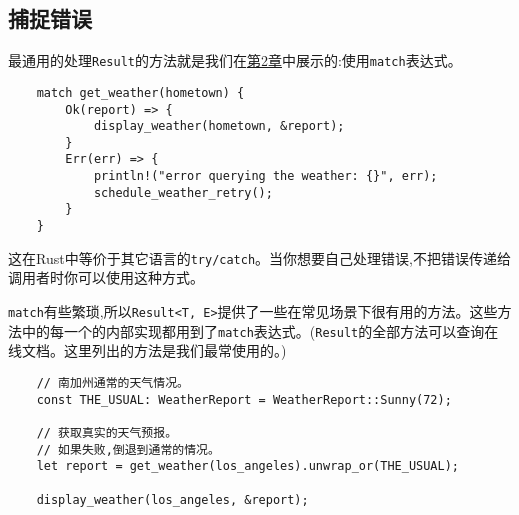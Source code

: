 \subsection{捕捉错误}
最通用的处理\texttt{Result}的方法就是我们在\hyperref[ch02]{第2章}中展示的:使用\texttt{match}表达式。
\begin{verbatim}
    match get_weather(hometown) {
        Ok(report) => {
            display_weather(hometown, &report);
        }
        Err(err) => {
            println!("error querying the weather: {}", err);
            schedule_weather_retry();
        }
    }
\end{verbatim}

这在Rust中等价于其它语言的\texttt{try/catch}。当你想要自己处理错误,不把错误传递给调用者时你可以使用这种方式。

\texttt{match}有些繁琐,所以\texttt{Result<T, E>}提供了一些在常见场景下很有用的方法。这些方法中的每一个的内部实现都用到了\texttt{match}表达式。(\texttt{Result}的全部方法可以查询在线文档。这里列出的方法是我们最常使用的。)





\begin{verbatim}
    // 南加州通常的天气情况。
    const THE_USUAL: WeatherReport = WeatherReport::Sunny(72);

    // 获取真实的天气预报。
    // 如果失败,倒退到通常的情况。
    let report = get_weather(los_angeles).unwrap_or(THE_USUAL);

    display_weather(los_angeles, &report);
\end{verbatim}



